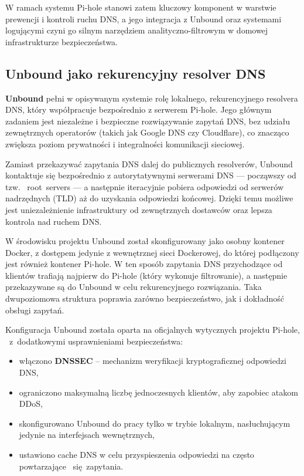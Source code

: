 \documentclass[
    left=2.5cm,         %
    right=2.5cm,        %
    top=2.5cm,          %
    bottom=3cm,         %
    bindingoffset=6mm,  %
    nohyphenation=true %
]{eiti/eiti-thesis} %
\begin{document}
W ramach systemu Pi-hole stanowi zatem kluczowy komponent w warstwie prewencji i kontroli ruchu DNS, a jego integracja z Unbound oraz systemami logującymi czyni 
go silnym narzędziem analityczno-filtrowym w domowej infrastrukturze bezpieczeństwa.

\subsection{Unbound jako rekurencyjny resolver DNS}

\textbf{Unbound}\cite{unbound-docs} pełni w opisywanym systemie rolę lokalnego, rekurencyjnego resolvera DNS, który współpracuje bezpośrednio z serwerem Pi-hole. 
Jego głównym zadaniem jest niezależne i bezpieczne rozwiązywanie zapytań DNS\cite{dns-wikipedia}, bez udziału zewnętrznych operatorów (takich jak Google DNS czy Cloudflare), co znacząco zwiększa poziom prywatności i integralności komunikacji sieciowej.

Zamiast przekazywać zapytania DNS dalej do publicznych resolverów, Unbound kontaktuje się bezpośrednio z autorytatywnymi serwerami DNS — począwszy od tzw. ~root~servers — a następnie iteracyjnie pobiera odpowiedzi od serwerów nadrzędnych (TLD)\cite{tld-wikipedia} aż do uzyskania odpowiedzi końcowej. Dzięki temu możliwe jest uniezależnienie infrastruktury od zewnętrznych dostawców oraz lepsza kontrola nad ruchem DNS.

W środowisku projektu Unbound został skonfigurowany jako osobny kontener Docker, z dostępem jedynie z wewnętrznej sieci Dockerowej, do której podłączony jest również kontener Pi-hole\cite{config-unbound}. W ten sposób zapytania DNS przychodzące od klientów trafiają najpierw do Pi-hole (który wykonuje filtrowanie), a następnie przekazywane są do Unbound w celu rekurencyjnego rozwiązania. Taka dwupoziomowa struktura poprawia zarówno bezpieczeństwo, jak i dokładność obsługi zapytań.

Konfiguracja Unbound została oparta na oficjalnych wytycznych projektu Pi-hole, ~z~dodatkowymi usprawnieniami bezpieczeństwa:
\begin{itemize}
    \item włączono \textbf{DNSSEC}\cite{dnssec-wikipedia} – mechanizm weryfikacji kryptograficznej odpowiedzi DNS,
    \item ograniczono maksymalną liczbę jednoczesnych klientów, aby zapobiec atakom DDoS,
    \item skonfigurowano Unbound do pracy tylko w trybie lokalnym, nasłuchującym jedynie na interfejsach wewnętrznych,
    \item ustawiono cache DNS w celu przyspieszenia odpowiedzi na często powtarzające ~się~zapytania.
\end{itemize}
\end{document}
